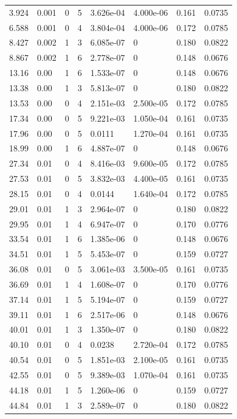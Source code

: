 \documentclass[preview]{standalone}
\begin{document}
{{\begin{tabular}{L{1.2cm}C{1.2cm} C{0.3cm}C{0.5cm} C{1.4cm}C{1.4cm} C{1.4cm}C{1.4cm}}
  3.924  &  0.001  & 0     &  5 &  3.626e-04  & 4.000e-06  & 0.161 &  0.0735   \\ 
  6.588  &  0.001  & 0     &  4 &  3.804e-04  & 4.000e-06  & 0.172 &  0.0785   \\ 
  8.427  &  0.002  & 1     &  3 &  6.085e-07  & 0  & 0.180 &  0.0822   \\ 
  8.867  &  0.002  & 1     &  6 &  2.778e-07  & 0  & 0.148 &  0.0676   \\ 
  13.16  &  0.00  & 1     &  6 &  1.533e-07  & 0  & 0.148 &  0.0676   \\ 
  13.38  &  0.00  & 1     &  3 &  5.813e-07  & 0  & 0.180 &  0.0822   \\ 
  13.53  &  0.00  & 0     &  4 &  2.151e-03  & 2.500e-05  & 0.172 &  0.0785   \\ 
  17.34  &  0.00  & 0     &  5 &  9.221e-03  & 1.050e-04  & 0.161 &  0.0735   \\ 
  17.96  &  0.00  & 0     &  5 &  0.0111  & 1.270e-04  & 0.161 &  0.0735   \\ 
  18.99  &  0.00  & 1     &  6 &  4.887e-07  & 0  & 0.148 &  0.0676   \\ 
  27.34  &  0.01  & 0     &  4 &  8.416e-03  & 9.600e-05  & 0.172 &  0.0785   \\ 
  27.53  &  0.01  & 0     &  5 &  3.832e-03  & 4.400e-05  & 0.161 &  0.0735   \\ 
  28.15  &  0.01  & 0     &  4 &  0.0144  & 1.640e-04  & 0.172 &  0.0785   \\ 
  29.01  &  0.01  & 1     &  3 &  2.964e-07  & 0  & 0.180 &  0.0822   \\ 
  29.95  &  0.01  & 1     &  4 &  6.947e-07  & 0  & 0.170 &  0.0776   \\ 
  33.54  &  0.01  & 1     &  6 &  1.385e-06  & 0  & 0.148 &  0.0676   \\ 
  34.51  &  0.01  & 1     &  5 &  5.453e-07  & 0  & 0.159 &  0.0727   \\ 
  36.08  &  0.01  & 0     &  5 &  3.061e-03  & 3.500e-05  & 0.161 &  0.0735   \\ 
  36.69  &  0.01  & 1     &  4 &  1.608e-07  & 0  & 0.170 &  0.0776   \\ 
  37.14  &  0.01  & 1     &  5 &  5.194e-07  & 0  & 0.159 &  0.0727   \\ 
  39.11  &  0.01  & 1     &  6 &  2.517e-06  & 0  & 0.148 &  0.0676   \\ 
  40.01  &  0.01  & 1     &  3 &  1.350e-07  & 0  & 0.180 &  0.0822   \\ 
  40.10  &  0.01  & 0     &  4 &  0.0238  & 2.720e-04  & 0.172 &  0.0785   \\ 
  40.54  &  0.01  & 0     &  5 &  1.851e-03  & 2.100e-05  & 0.161 &  0.0735   \\ 
  42.55  &  0.01  & 0     &  5 &  9.389e-03  & 1.070e-04  & 0.161 &  0.0735   \\ 
  44.18  &  0.01  & 1     &  5 &  1.260e-06  & 0  & 0.159 &  0.0727   \\ 
  44.84  &  0.01  & 1     &  3 &  2.589e-07  & 0  & 0.180 &  0.0822   \\ 
\hline 
\end{tabular} 

}}
\end{document}
